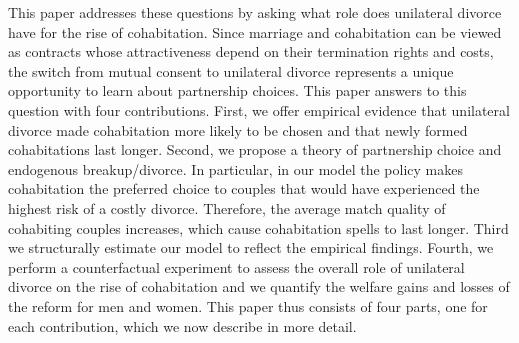 \documentclass[12pt]{article}
\numberwithin{table}{section}
\begin{document}
This paper addresses these questions by asking what role does unilateral divorce have for the rise of cohabitation. Since marriage and cohabitation can be viewed as contracts whose attractiveness depend on their termination rights and costs, the switch from mutual consent to unilateral divorce represents a unique opportunity to learn about partnership choices. This paper answers to this question with four contributions. First, we offer empirical evidence that unilateral divorce made cohabitation more likely to be chosen and that newly formed cohabitations last longer. Second, we propose a theory of partnership choice and endogenous breakup/divorce. In particular, in our model the policy makes cohabitation the preferred choice to couples that would have experienced the highest risk of a costly divorce. Therefore, the average match quality of cohabiting couples increases, which cause cohabitation spells to last longer. Third we structurally estimate our model to reflect the empirical findings. Fourth, we perform a counterfactual experiment to assess the overall role of unilateral divorce on the rise of cohabitation and we quantify the welfare gains and losses of the reform for men and women. This paper thus consists of four parts, one for each contribution, which we now describe in more detail.


\end{document}
